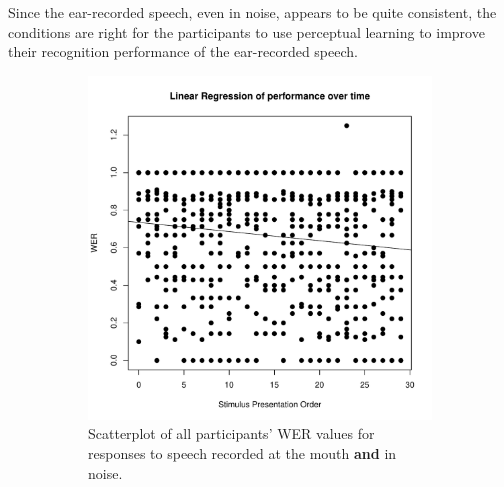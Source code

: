 \documentclass[dissertation,copyright]{uathesis}
\makeatletter
\def\maxwidth{ %
  \ifdim\Gin@nat@width>\linewidth
    \linewidth
  \else
    \Gin@nat@width
  \fi
}
\makeatother
\begin{document}
Since the ear-recorded speech, even in noise, appears to be quite consistent, the conditions are right for the participants to use perceptual learning to improve their recognition performance of the ear-recorded speech.

\begin{figure}%
\begin{subfigure}{0.47\textwidth}

\includegraphics[width=\maxwidth]{figure/line_graph_chrono_m-1} 

\caption{Scatterplot of all participants' WER values for responses to speech recorded at the mouth \textbf{and} in noise.}
\label{fig:linear_performance_m}
\end{subfigure}
\begin{subfigure}{0.47\textwidth}%


\end{subfigure}
\end{figure}
\end{document}
